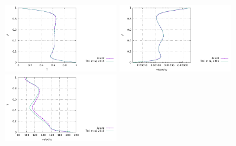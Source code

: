 \begin{center}
\includegraphics[width=5cm]{python_codes/fieldstone_28/results_case2/T_profile.pdf}
\includegraphics[width=5cm]{python_codes/fieldstone_28/results_case2/eta_profile.pdf}
\includegraphics[width=5cm]{python_codes/fieldstone_28/results_case2/V_profile.pdf}
\end{center}

